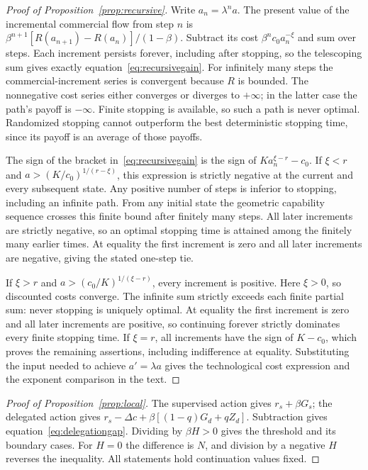\begin{proof}[Proof of Proposition~\ref{prop:recursive}]
Write $a_n=\lambda^na$. The present value of the incremental commercial flow from step $n$ is $\beta^{n+1}[R(a_{n+1})-R(a_n)]/(1-\beta)$. Subtract its cost $\beta^nc_0a_n^{-\xi}$ and sum over steps. Each increment persists forever, including after stopping, so the telescoping sum gives exactly equation~\eqref{eq:recursivegain}. For infinitely many steps the commercial-increment series is convergent because $R$ is bounded. The nonnegative cost series either converges or diverges to $+\infty$; in the latter case the path's payoff is $-\infty$. Finite stopping is available, so such a path is never optimal. Randomized stopping cannot outperform the best deterministic stopping time, since its payoff is an average of those payoffs.

The sign of the bracket in~\eqref{eq:recursivegain} is the sign of $Ka_n^{\xi-r}-c_0$. If $\xi<r$ and $a>(K/c_0)^{1/(r-\xi)}$, this expression is strictly negative at the current and every subsequent state. Any positive number of steps is inferior to stopping, including an infinite path. From any initial state the geometric capability sequence crosses this finite bound after finitely many steps. All later increments are strictly negative, so an optimal stopping time is attained among the finitely many earlier times. At equality the first increment is zero and all later increments are negative, giving the stated one-step tie.

If $\xi>r$ and $a>(c_0/K)^{1/(\xi-r)}$, every increment is positive. Here $\xi>0$, so discounted costs converge. The infinite sum strictly exceeds each finite partial sum: never stopping is uniquely optimal. At equality the first increment is zero and all later increments are positive, so continuing forever strictly dominates every finite stopping time. If $\xi=r$, all increments have the sign of $K-c_0$, which proves the remaining assertions, including indifference at equality. Substituting the input needed to achieve $a'=\lambda a$ gives the technological cost expression and the exponent comparison in the text.
\end{proof}

\begin{proof}[Proof of Proposition~\ref{prop:local}]
The supervised action gives $r_s+\beta G_s$; the delegated action gives $r_s-\Delta c+\beta[(1-q)G_d+qZ_d]$. Subtraction gives equation~\eqref{eq:delegationgap}. Dividing by $\beta H>0$ gives the threshold and its boundary cases. For $H=0$ the difference is $N$, and division by a negative $H$ reverses the inequality. All statements hold continuation values fixed.
\end{proof}

